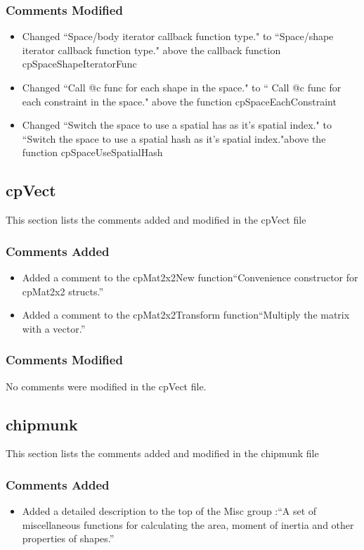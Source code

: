 \documentclass[12pt]{article}
\begin{document}
\subsubsection{Comments Modified}
\begin{itemize}
\item Changed ``Space/body iterator callback function type." to ``Space/shape iterator callback function type." above the callback function cpSpaceShapeIteratorFunc
\item Changed ``Call @c func for each shape in the space." to `` Call @c func for each constraint in the space." above the function cpSpaceEachConstraint
\item Changed ``Switch the space to use a spatial has as it's spatial index." to ``Switch the space to use a spatial hash as it's spatial index."above the function cpSpaceUseSpatialHash
\end{itemize}


\subsection{cpVect} 
This section lists the comments added and modified  in the cpVect file

\subsubsection{Comments Added}
\begin{itemize}
\item Added a comment to the cpMat2x2New function``Convenience constructor for cpMat2x2 structs.''
\item Added a comment to the cpMat2x2Transform function``Multiply the matrix with a vector.''
\end{itemize}

\subsubsection{Comments Modified}
No comments were modified in the cpVect file.


\subsection{chipmunk} 
This section lists the comments added and modified  in the chipmunk file

\subsubsection{Comments Added}
\begin{itemize}
\item Added a detailed description to the top of the Misc group :``A set of miscellaneous functions for calculating the area, moment of inertia and other properties of shapes.''
\end{itemize}
\end{document}
